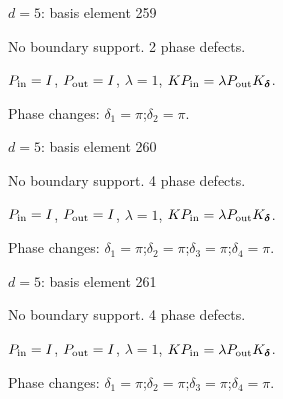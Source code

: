 \newpage
{}
{\Large $d=5$: basis element 259}\par
No boundary support. 2 phase defects.
\begin{center}
\end{center}
\vspace{-1mm}
$P_{\rm in}=I$, \quad $P_{\rm out}=I$, \quad $\lambda=1$, \qquad $K P_{\rm in}=\lambda P_{\rm out}K_{\boldsymbol\delta}$.
\par\smallskip\begin{minipage}{.98\linewidth}\small Phase changes: $\delta_{1}=\pi$;\quad $\delta_{2}=\pi$.\end{minipage}
\vfill
{\footnotesize\texttt{}}
\newpage
{}
{\Large $d=5$: basis element 260}\par
No boundary support. 4 phase defects.
\begin{center}
\end{center}
\vspace{-1mm}
$P_{\rm in}=I$, \quad $P_{\rm out}=I$, \quad $\lambda=1$, \qquad $K P_{\rm in}=\lambda P_{\rm out}K_{\boldsymbol\delta}$.
\par\smallskip\begin{minipage}{.98\linewidth}\small Phase changes: $\delta_{1}=\pi$;\quad $\delta_{2}=\pi$;\quad $\delta_{3}=\pi$;\quad $\delta_{4}=\pi$.\end{minipage}
\vfill
{\footnotesize\texttt{}}
\newpage
{}
{\Large $d=5$: basis element 261}\par
No boundary support. 4 phase defects.
\begin{center}
\end{center}
\vspace{-1mm}
$P_{\rm in}=I$, \quad $P_{\rm out}=I$, \quad $\lambda=1$, \qquad $K P_{\rm in}=\lambda P_{\rm out}K_{\boldsymbol\delta}$.
\par\smallskip\begin{minipage}{.98\linewidth}\small Phase changes: $\delta_{1}=\pi$;\quad $\delta_{2}=\pi$;\quad $\delta_{3}=\pi$;\quad $\delta_{4}=\pi$.\end{minipage}
\vfill
{\footnotesize\texttt{}}
\newpage
{}
